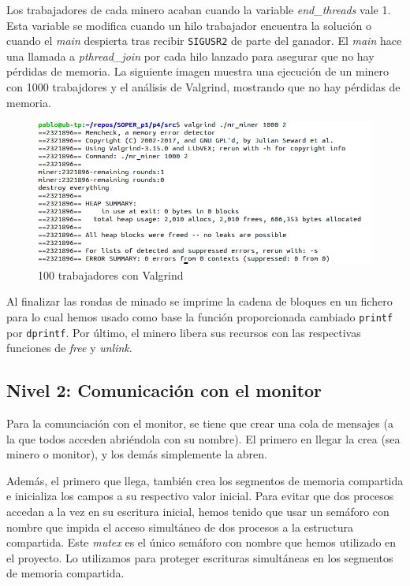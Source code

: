 \documentclass{article}
\begin{document}
    Los trabajadores de cada minero acaban cuando la variable \textit{end\_threads} vale 1. Esta variable se modifica cuando un hilo trabajador encuentra la solución o cuando el \textit{main} despierta tras recibir \texttt{SIGUSR2} de parte del ganador. El \textit{main} hace una llamada a \textit{pthread\_join} por cada hilo lanzado para asegurar que no hay pérdidas de memoria. La siguiente imagen muestra una ejecución de un minero con 1000 trabajdores y el análisis de Valgrind, mostrando que no hay pérdidas de memoria.

    \begin{figure}[h!]
        \centering
        \includegraphics[scale=.41]{./pruebas/valgrind_1000_trabajadores}
        \caption{100 trabajadores con Valgrind}
    \end{figure}


    
    Al finalizar las rondas de minado se imprime la cadena de bloques en un fichero para lo cual hemos usado como base la función proporcionada cambiado \texttt{printf} por \texttt{dprintf}. Por último, el minero libera sus recursos con las respectivas funciones de \textit{free} y \textit{unlink}.

    

\subsection*{Nivel 2: Comunicación con el monitor}

    Para la comunciación con el monitor, se tiene que crear una cola de mensajes (a la que todos acceden abriéndola con su nombre). El primero en llegar la crea (sea minero o monitor), y los demás simplemente la abren.
    
    Además, el primero que llega, también crea los segmentos de memoria compartida e inicializa los campos a su respectivo valor inicial. Para evitar que dos procesos accedan a la vez en su escritura inicial, hemos tenido que usar un semáforo con nombre que impida el acceso simultáneo de dos procesos a la estructura compartida.
    Este \textit{mutex} es el único semáforo con nombre que hemos utilizado en el proyecto. Lo utilizamos para proteger escrituras simultáneas en los segmentos de memoria compartida.
\end{document}
